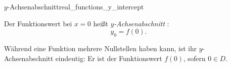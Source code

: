 \begin{FunctionPropertyBox}{$y$-Achsenabschnitt}{real_functions_y_intercept}
  \begin{minipage}[c]{0.55\linewidth}
    \raggedright
    Der Funktionswert bei $x=0$ heißt \emph{$y$-Achsenabschnitt} :
    \[
      y_0=f(0).
    \]
  \end{minipage}\hfill
  \begin{minipage}[c]{0.43\linewidth}
    \centering
  \end{minipage}
\end{FunctionPropertyBox}
Während eine Funktion mehrere Nullstellen haben kann, ist ihr
$y$-Achsenabschnitt eindeutig: Er ist der Funktionswert $f(0)$, sofern
$0\in D$.
